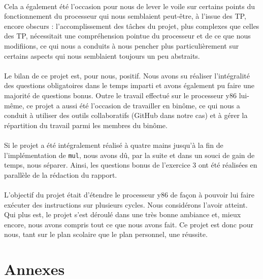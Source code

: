 \documentclass[12pt]{article}
\begin{document}
\paragraph{}Cela a également été l'occasion pour nous de lever le voile sur certains points du fonctionnement du processeur qui nous semblaient peut-être, à l'issue des TP, encore obscurs : l'accomplissement des tâches du projet, plus complexes que celles des TP, nécessitait une compréhension pointue du processeur et de ce que nous modifiions, ce qui nous a conduits à nous pencher plus particulièrement sur certains aspects qui nous semblaient toujours un peu abstraits.

\paragraph{}Le bilan de ce projet est, pour nous, positif. Nous avons su réaliser l'intégralité des questions obligatoires dans le temps imparti et avons également pu faire une majorité de questions bonus. Outre le travail effectué sur le processeur y86 lui-même, ce projet a aussi été l'occasion de travailler en binôme, ce qui nous a conduit à utiliser des outils collaboratifs (GitHub dans notre cas) et à gérer la répartition du travail parmi les membres du binôme.

\paragraph{}Si le projet a été intégralement réalisé à quatre mains jusqu'à la fin de l'implémentation de \verb+mul+, nous avons dû, par la suite et dans un souci de gain de temps, nous séparer. Ainsi, les questions bonus de l'exercice 3 ont été réalisées en parallèle de la rédaction du rapport.

\paragraph{}L'objectif du projet était d'étendre le processeur y86 de façon à pouvoir lui faire exécuter des instructions sur plusieurs cycles. Nous considérons l'avoir atteint. Qui plus est, le projet s'est déroulé dans une très bonne ambiance et, mieux encore, nous avons compris tout ce que nous avons fait. Ce projet est donc pour nous, tant sur le plan scolaire que le plan personnel, une réussite.



\appendix
\section{Annexes}
\end{document}
